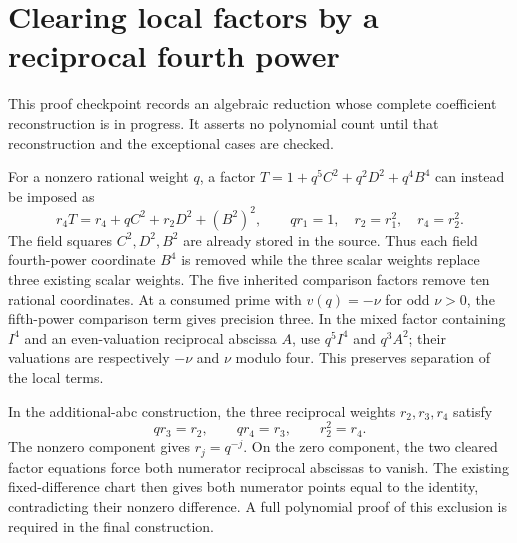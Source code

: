 \section{Clearing local factors by a reciprocal fourth power}
This proof checkpoint records an algebraic reduction whose complete
coefficient reconstruction is in progress. It asserts no polynomial
count until that reconstruction and the exceptional cases are checked.

For a nonzero rational weight $q$, a factor
$T=1+q^5C^2+q^2D^2+q^4B^4$ can instead be imposed as
\[
 r_4T=r_4+qC^2+r_2D^2+(B^2)^2,
 \qquad qr_1=1,\quad r_2=r_1^2,\quad r_4=r_2^2.
\]
The field squares $C^2,D^2,B^2$ are already stored in the source.
Thus each field fourth-power coordinate $B^4$ is removed while the
three scalar weights replace three existing scalar weights.
The five inherited comparison factors remove ten rational coordinates.
At a consumed prime with $v(q)=-\nu$ for odd $\nu>0$, the fifth-power
comparison term gives precision three. In the mixed factor containing
$I^4$ and an even-valuation reciprocal abscissa $A$, use $q^5I^4$
and $q^3A^2$; their valuations are respectively $-\nu$ and $\nu$
modulo four. This preserves separation of the local terms.

In the additional-abc construction, the three reciprocal weights
$r_2,r_3,r_4$ satisfy
\[
 qr_3=r_2,\qquad qr_4=r_3,\qquad r_2^2=r_4.
\]
The nonzero component gives $r_j=q^{-j}$. On the zero component,
the two cleared factor equations force both numerator reciprocal
abscissas to vanish. The existing fixed-difference chart then gives
both numerator points equal to the identity, contradicting their
nonzero difference. A full polynomial proof of this exclusion is
required in the final construction.

